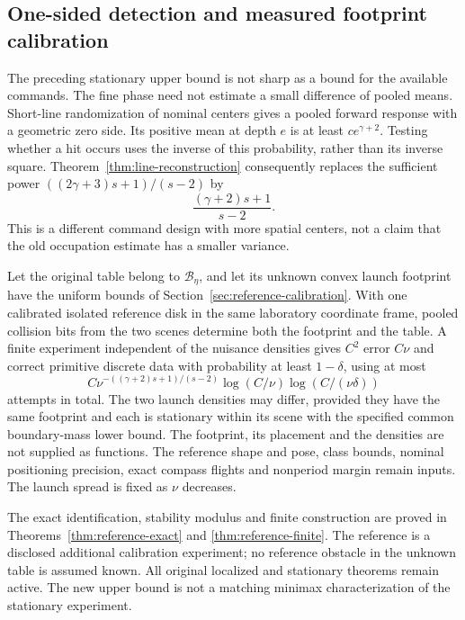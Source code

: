 \subsection{One-sided detection and measured footprint calibration}
The preceding stationary upper bound is not sharp as a bound for the
available commands. The fine phase need not estimate a small difference
of pooled means. Short-line randomization of nominal centers gives a
pooled forward response with a geometric zero side. Its positive mean
at depth $e$ is at least $c e^{\gamma+2}$. Testing whether a hit occurs
uses the inverse of this probability, rather than its inverse square.
Theorem~\ref{thm:line-reconstruction} consequently replaces the sufficient
power $((2\gamma+3)s+1)/(s-2)$ by
\[
                         \frac{(\gamma+2)s+1}{s-2}.
\]
This is a different command design with more spatial centers, not a
claim that the old occupation estimate has a smaller variance.

\begin{theorem}
\label{thm:reference-main}
Let the original table belong to $\mathcal B_\eta$, and let its unknown
convex launch footprint have the uniform bounds of
Section~\ref{sec:reference-calibration}. With one calibrated isolated
reference disk in the same laboratory coordinate frame, pooled collision
bits from the two scenes determine both the footprint and the table.
A finite experiment independent of the nuisance densities gives $C^2$
error $C\nu$ and correct primitive discrete data with probability at
least $1-\delta$, using at most
\[
 C\nu^{-((\gamma+2)s+1)/(s-2)}
                  \log(C/\nu)\log(C/(\nu\delta))
\]
attempts in total. The two launch densities may differ, provided they
have the same footprint and each is stationary within its scene with
the specified common boundary-mass lower bound. The footprint, its
placement and the densities are not supplied as functions. The reference
shape and pose, class bounds, nominal positioning precision, exact
compass flights and nonperiod margin remain inputs. The launch spread
is fixed as $\nu$ decreases.
\end{theorem}

The exact identification, stability modulus and finite construction
are proved in Theorems~\ref{thm:reference-exact} and
\ref{thm:reference-finite}. The reference is a disclosed additional
calibration experiment; no reference obstacle in the unknown table is
assumed known. All original localized and stationary theorems remain
active. The new upper bound is not a matching minimax characterization
of the stationary experiment.
